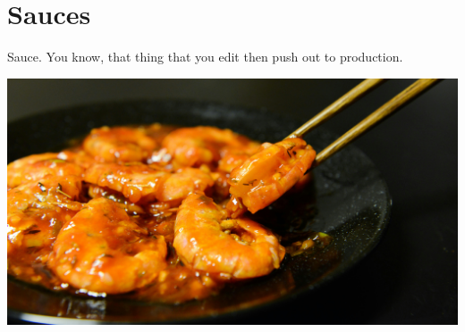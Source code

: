 \pagebreak
\chapter{Sauces}

Sauce. You know, that thing that you edit then push out to production.

\centering
\includegraphics[scale=0.075]{images/pexels-photo-699544.jpg}